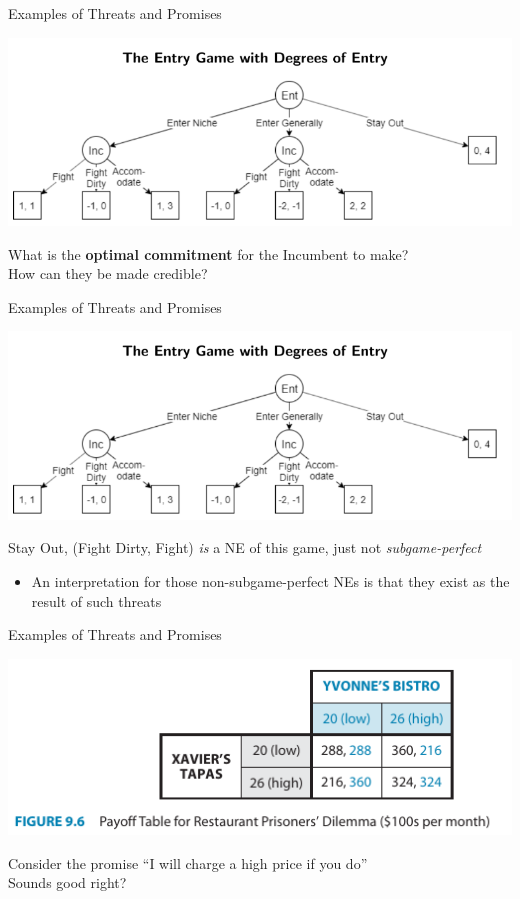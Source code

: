 \begin{frame}{Examples of Threats and Promises}
  \begin{center}
    \includegraphics[width=.7\textwidth] {figures/entrygame.png}
  \end{center} 
  What is the \textbf{optimal commitment} for the \alert{Incumbent} to make? \\
  How can they be made credible?
\end{frame}


\begin{frame}{Examples of Threats and Promises}
  \begin{center}
    \includegraphics[width=.7\textwidth] {figures/entrygame.png}
  \end{center} 
  {Stay Out, (Fight Dirty, Fight)} \textit{is} a NE of this game, just not \textit{subgame-perfect}
  \begin{itemize}
    \item An interpretation for those non-subgame-perfect NEs is that they exist as the result of such threats 
  \end{itemize}
\end{frame}


\begin{frame}{Examples of Threats and Promises}
  \begin{center}
    \includegraphics[width=.8\textwidth]{figures/fig96.png} 
  \end{center} 
  Consider the promise ``I will charge a high price if you do'' \\
  Sounds good right?
\end{frame}

